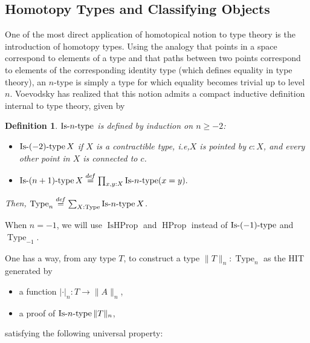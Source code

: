 \documentclass[preprint,9pt,numbers]{sigplanconf}
\newtheorem{defi}[thm]{Definition}
\newcommand \defeq {\overset{de\hspace{-0.2ex}f}{=}}
\newcommand{\mynote}[2]{
    \fbox{\bfseries\sffamily\scriptsize#1}
    {\small$\blacktriangleright$\textsf{\emph{#2}}$\blacktriangleleft$}~}
\newcommand\kq[1]{\mynote{KQ}{#1}}
\newcommand{\ie}{i.e,\xspace}
\newcommand{\eg}{e.g,\xspace}
\DeclareMathOperator{\Type}{Type}
\DeclareMathOperator{\HProp}{HProp}
\DeclareMathOperator{\IsHProp}{IsHProp}
\DeclareMathOperator{\Contr}{Contr}
\DeclareMathOperator{\IsContr}{IsContr}
\def\mymathhyphen{{\hbox{-}}}
\newcommand{\IsType}[1]
{\mathop{\mathrm{Is\mymathhyphen}#1\mathrm{\mymathhyphen type}} }
\newcommand \squash[1] {\| #1 \| }
\begin{document}
 
 \subsection{Homotopy Types and Classifying Objects}
\label{ssec:hott}

One of the most direct application of homotopical notion to type
theory is the introduction of homotopy types. 
%
Using the analogy that points in a space correspond to elements of a
type and that paths between two points correspond to 
elements of the corresponding identity type (which defines equality in type theory),  
%
an $n$-type is simply a type
for which equality becomes trivial up to level $n$. 
%
Voevodsky has realized that this notion admits a compact inductive definition
internal to type theory, given by
\begin{defi}
  $\IsType n$ is defined by induction on $n\geqslant -2$:
  \begin{itemize}
  \item $\IsType {(-2)} X$ if $X$ is a contractible type, \ie $X$
    is pointed by $c:X$, and every other point in $X$ is connected to $c$.
  \item $\IsType {(n+1)} X \defeq \prod_{x,y:X} \IsType n (x=y).$
  \end{itemize}
  Then, $\Type_n \defeq \sum_{X:\Type} \IsType n X$.
\end{defi}
%
When $n=-1$, we will use $\IsHProp$ and $\HProp$ instead of
$\IsType{(-1)}$ and $\Type_{-1}$.


One has a way, from any type $T$, to construct a type
$\|T\|_n:\Type_n$ as the HIT generated by
\begin{itemize}
\item a function $|\cdot|_n : T \to \|A\|_n$,
\item a proof of $\IsType n \|T\|_n$,
\end{itemize}
 satisfying the following universal property:
\end{document}
